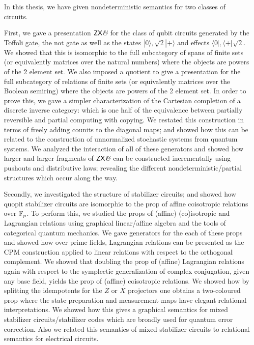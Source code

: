 
In this thesis, we have given nondeterministic semantics for two classes of circuits. 


First, we gave a presentation $\mathsf{ZX}\textit{\&}$ for the  class of qubit circuits generated by the Toffoli gate, the not gate as well as the states $|0\rangle, \sqrt 2 |+\rangle$ and effects $\langle 0 |, \langle +|\sqrt{2}$.  We showed that this is isomorphic to the full subcategory of spans of finite sets (or equivalently matrices over the natural numbers) where the objects are powers of the 2 element set.  We also imposed a quotient to give a presentation for the full subcategory of relations of finite sets (or equivalently matrices over the Boolean semiring) where the objects are powers of the 2 element set.  In order to prove this, we gave a simpler characterization of the Cartesian completion of a discrete inverse category: which is one half of the equivalence between partially reversible and partial computing with copying.  We restated this construction in terms of freely adding counits to the diagonal maps; and showed how this can be related to the construction of unnormalized stochastic systems from quantum systems.  We analyzed the interaction of all of these generators and showed how larger and larger fragments of $\mathsf{ZX}\textit{\&}$ can be constructed incrementally using pushouts and distributive laws; revealing the different nondeterministic/partial structures which occur along the way.


Secondly, we investigated the structure of stabilizer circuits; and showed how quopit stabilizer circuits are isomorphic to the prop of affine coisotropic relations over $\mathbb{F}_p$.  To perform this, we studied  the props of (affine) (co)isotropic and Lagrangian relations using graphical linear/affine algebra and the tools of categorical quantum mechanics.  We gave generators for the each of these props and showed how over prime fields, Lagrangian relations can be presented as the CPM construction applied to linear relations with respect to the orthogonal complement.  We showed that doubling the prop of (affine) Lagrangian relations again with respect to the symplectic generalization of complex conjugation, given any base field, yields the prop of (affine) coisotropic relations.  We showed how by splitting the idempotents for the  $Z$ or $X$ projectors one obtains a two-coloured prop where the state preparation and measurement maps have elegant relational interpretations.  We showed how this gives a graphical semantics for mixed stabilizer circuits/stabilizer codes which are broadly used for quantum error correction.  Also we related this semantics of mixed stabilizer circuits to relational semantics for electrical circuits.


